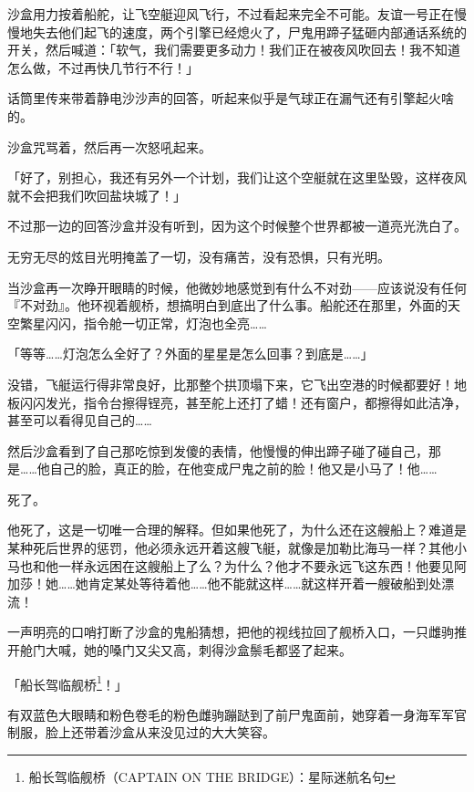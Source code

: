 \horizonline


沙盒用力按着船舵，让飞空艇迎风飞行，不过看起来完全不可能。友谊一号正在慢慢地失去他们起飞的速度，两个引擎已经熄火了，尸鬼用蹄子猛砸内部通话系统的开关，然后喊道：「软气，我们需要更多动力！我们正在被夜风吹回去！我不知道怎么做，不过再快几节行不行！」

话筒里传来带着静电沙沙声的回答，听起来似乎是气球正在漏气还有引擎起火啥的。

沙盒咒骂着，然后再一次怒吼起来。

「好了，别担心，我还有另外一个计划，我们让这个空艇就在这里坠毁，这样夜风就不会把我们吹回盐块城了！」

不过那一边的回答沙盒并没有听到，因为这个时候整个世界都被一道亮光洗白了。

无穷无尽的炫目光明掩盖了一切，没有痛苦，没有恐惧，只有光明。

\horizonline

\unknowndaytimeplace

当沙盒再一次睁开眼睛的时候，他微妙地感觉到有什么不对劲——应该说没有任何『不对劲』。他环视着舰桥，想搞明白到底出了什么事。船舵还在那里，外面的天空繁星闪闪，指令舱一切正常，灯泡也全亮……{}

「等等……灯泡怎么全好了？外面的星星是怎么回事？到底是……」

没错，飞艇运行得非常良好，比那整个拱顶塌下来，它飞出空港的时候都要好！地板闪闪发光，指令台擦得锃亮，甚至舵上还打了蜡！还有窗户，都擦得如此洁净，甚至可以看得见自己的……{}

然后沙盒看到了自己那吃惊到发傻的表情，他慢慢的伸出蹄子碰了碰自己，那是……他自己的脸，真正的脸，在他变成尸鬼之前的脸！他又是小马了！他……{}

死了。

他死了，这是一切唯一合理的解释。但如果他死了，为什么还在这艘船上？难道是某种死后世界的惩罚，他必须永远开着这艘飞艇，就像是加勒比海马一样？其他小马也和他一样永远困在这艘船上了么？为什么？他才不要永远飞这东西！他要见阿加莎！她……她肯定某处等待着他……他不能就这样……就这样开着一艘破船到处漂流！

一声明亮的口哨打断了沙盒的鬼船猜想，把他的视线拉回了舰桥入口，一只雌驹推开舱门大喊，她的嗓门又尖又高，刺得沙盒鬃毛都竖了起来。

「船长驾临舰桥\footnote{船长驾临舰桥（CAPTAIN ON THE BRIDGE）：星际迷航名句}！」

有双蓝色大眼睛和粉色卷毛的粉色雌驹蹦跶到了前尸鬼面前，她穿着一身海军军官制服，脸上还带着沙盒从来没见过的大大笑容。

